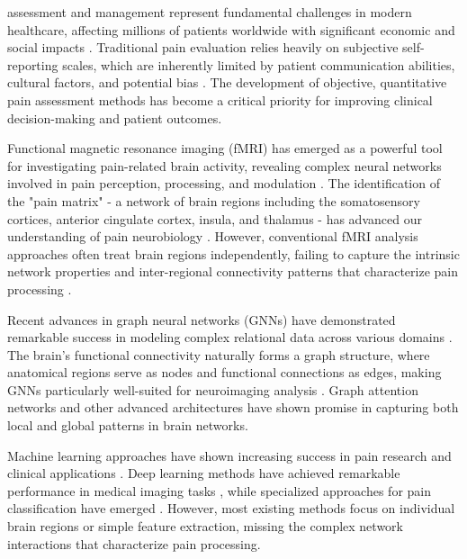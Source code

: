 \documentclass[10pt,journal,compsoc]{IEEEtran}
\begin{document}
 assessment and management represent fundamental challenges in modern healthcare, affecting millions of patients worldwide with significant economic and social impacts \cite{hjermstad2011studies}. Traditional pain evaluation relies heavily on subjective self-reporting scales, which are inherently limited by patient communication abilities, cultural factors, and potential bias \cite{williamson2005pain}. The development of objective, quantitative pain assessment methods has become a critical priority for improving clinical decision-making and patient outcomes.

Functional magnetic resonance imaging (fMRI) has emerged as a powerful tool for investigating pain-related brain activity, revealing complex neural networks involved in pain perception, processing, and modulation \cite{tracey2008neuromatrix,apkarian2011human}. The identification of the "pain matrix" - a network of brain regions including the somatosensory cortices, anterior cingulate cortex, insula, and thalamus - has advanced our understanding of pain neurobiology \cite{melzack2001pain,wager2013atlas}. However, conventional fMRI analysis approaches often treat brain regions independently, failing to capture the intrinsic network properties and inter-regional connectivity patterns that characterize pain processing \cite{power2011functional}.

Recent advances in graph neural networks (GNNs) have demonstrated remarkable success in modeling complex relational data across various domains \cite{kipf2016semi,hamilton2017inductive,wu2020comprehensive}. The brain's functional connectivity naturally forms a graph structure, where anatomical regions serve as nodes and functional connections as edges, making GNNs particularly well-suited for neuroimaging analysis \cite{ktena2018distance,parisot2018spectral}. Graph attention networks \cite{veličković2017graph} and other advanced architectures have shown promise in capturing both local and global patterns in brain networks.

Machine learning approaches have shown increasing success in pain research and clinical applications \cite{davis2020machine}. Deep learning methods have achieved remarkable performance in medical imaging tasks \cite{litjens2017survey,rajpurkar2017chexnet,esteva2017dermatologist}, while specialized approaches for pain classification have emerged \cite{brown2011towards,woo2017quantifying}. However, most existing methods focus on individual brain regions or simple feature extraction, missing the complex network interactions that characterize pain processing.
\end{document}
